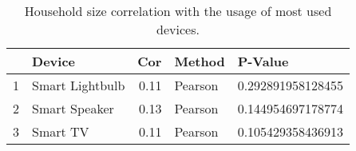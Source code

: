 \begin{table}[ht]
\centering
\begin{tabular}{rlrll}
  \hline
 & Device & Cor & Method & P-Value \\ 
  \hline
1 & Smart Lightbulb & 0.11 & Pearson & 0.292891958128455   \\ 
  2 & Smart Speaker & 0.13 & Pearson & 0.144954697178774   \\ 
  3 & Smart TV & 0.11 & Pearson & 0.105429358436913   \\ 
   \hline
\end{tabular}
\caption{Household size correlation with the usage of most used devices.} 
\label{RQ3_H2_UsageChildren}
\end{table}
